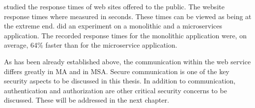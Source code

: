 \begin{sloppypar}
    \citet{webdelays} studied the response times of web sites offered to the
    public. The website response times where measured in seconds. These times
    can be viewed as being at the extreme end. \citet{Johansson_2019} did an
    experiment on a monolithic and a microservices application. The recorded
    response times for the monolithic application were, on average, 64\% faster
    than for the microservice application.
\end{sloppypar}
\begin{sloppypar}
    As has been already established above, the communication within the web
    service differs greatly in MA and in MSA. Secure communication is one of the
    key security aspects to be discussed in this thesis. In addition to
    communication, authentication and authorization are other critical security
    concerns to be discussed. These will be addressed in the next chapter.
\end{sloppypar}


